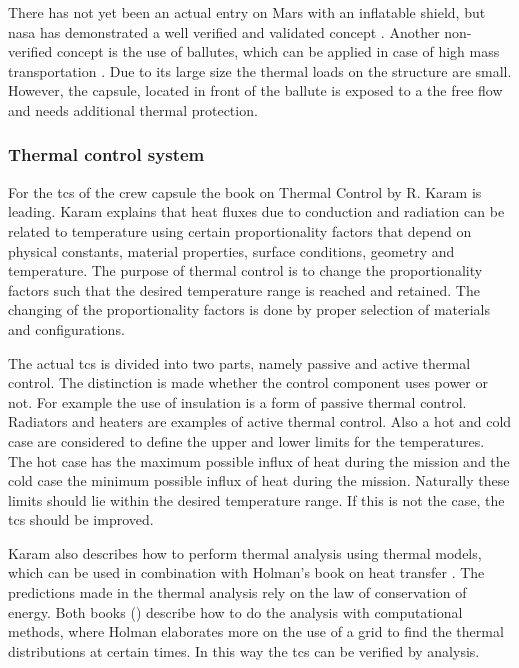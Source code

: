 There has not yet been an actual entry on Mars with an inflatable shield, but \gls{nasa} has demonstrated a well verified and validated concept \cite{Dillman2010, Dillman2012}. Another non-verified concept is the use of ballutes, which can be applied in case of high mass transportation \cite{Hall2001}. Due to its large size the thermal loads on the structure are small. However, the capsule, located in front of the ballute is exposed to a the free flow and needs additional thermal protection.

\subsubsection{Thermal control system}
For the \gls{tcs} of the crew capsule the book on Thermal Control by R. Karam is leading. \cite{Karam1998} Karam explains that heat fluxes due to conduction and radiation can be related to temperature using certain proportionality factors that depend on physical constants, material properties, surface conditions, geometry and temperature. The purpose of thermal control is to change the proportionality factors such that the desired temperature range is reached and retained. The changing of the proportionality factors is done by proper selection of materials and configurations.

The actual \gls{tcs} is divided into two parts, namely passive and active thermal control. The distinction is made whether the control component uses power or not. For example the use of insulation is a form of passive thermal control. Radiators and heaters are examples of active thermal control. Also a hot and cold case are considered to define the upper and lower limits for the temperatures. The hot case has the maximum possible influx of heat during the mission and the cold case the minimum possible influx of heat during the mission. Naturally these limits should lie within the desired temperature range. If this is not the case, the \gls{tcs} should be improved.  \cite{Karam1998}

Karam also describes how to perform thermal analysis using thermal models, which can be used in combination with Holman's book on heat transfer \cite{Holman2002}. The predictions made in the thermal analysis rely on the law of conservation of energy. Both books (\cite{Karam1998,Holman2002}) describe how to do the analysis with computational methods, where Holman elaborates more on the use of a grid to find the thermal distributions at certain times. In this way the \gls{tcs} can be verified by analysis.




